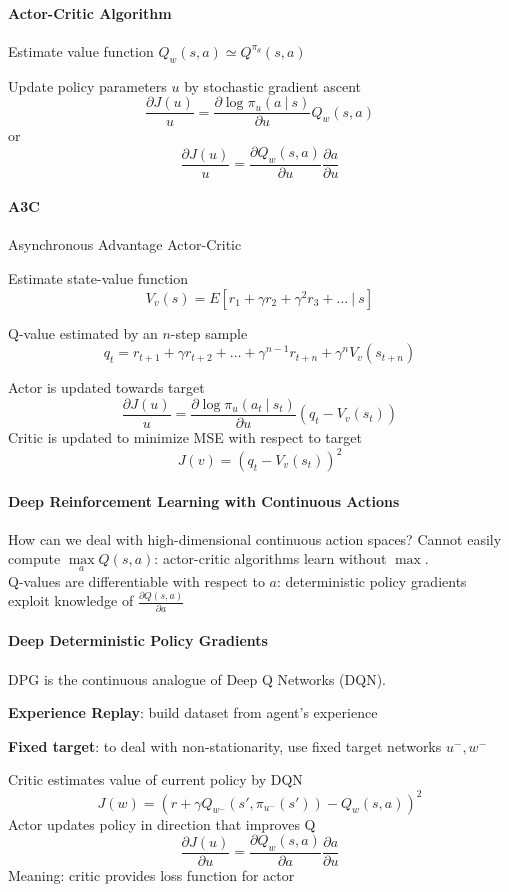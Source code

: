 \documentclass[10pt]{report}
\begin{document}
\paragraph{Actor-Critic Algorithm}
\begin{list}{}{}
	\item Estimate value function $Q_w(s,a)\simeq Q^{\pi_\theta}(s,a)$
	\item Update policy parameters $u$ by stochastic gradient ascent
	$$\frac{\partial J(u)}{u} = \frac{\partial\log\pi_u(a\:|\:s)}{\partial u}Q_w(s,a)$$
	or
	$$\frac{\partial J(u)}{u} = \frac{\partial Q_w(s,a)}{\partial u}\frac{\partial a}{\partial u}$$
\end{list}
\paragraph{A3C} Asynchronous Advantage Actor-Critic
\begin{list}{}{}
	\item Estimate state-value function
	$$V_v(s) = E[r_1+\gamma r_2 + \gamma^2 r_3+\ldots\:|\:s]$$
	\item Q-value estimated by an $n$-step sample
	$$q_t = r_{t+1} + \gamma r_{t+2} + \ldots + \gamma^{n-1}r_{t+n} + \gamma^n V_v(s_{t+n})$$
	\item Actor is updated towards target
	$$\frac{\partial J(u)}{u} = \frac{\partial\log\pi_u(a_t\:|\:s_t)}{\partial u}(q_t-V_v(s_t))$$
	Critic is updated to minimize MSE with respect to target
	$$J(v) = (q_t-V_v(s_t))^2$$
\end{list}
\paragraph{Deep Reinforcement Learning with Continuous Actions} How can we deal with high-dimensional continuous action spaces? Cannot easily compute $\max\limits_a Q(s,a)$: actor-critic algorithms learn without $\max$.\\
Q-values are differentiable with respect to $a$: deterministic policy gradients exploit knowledge of $\frac{\partial Q(s,a)}{\partial a}$
\paragraph{Deep Deterministic Policy Gradients} DPG is the continuous analogue of Deep Q Networks (DQN).
\begin{list}{}{}
	\item \textbf{Experience Replay}: build dataset from agent's experience
	\item \textbf{Fixed target}: to deal with non-stationarity, use fixed target networks $u^-, w^-$
	\item Critic estimates value of current policy by DQN
	$$J(w) = \left(r+\gamma Q_{w^-}(s',\pi_{u^-}(s'))-Q_w(s,a)\right)^2$$
	Actor updates policy in direction that improves Q
	$$\frac{\partial J(u)}{\partial u}=\frac{\partial Q_w(s,a)}{\partial a}\frac{\partial a}{\partial u}$$
	Meaning: critic provides loss function for actor
\end{list}
\end{document}
